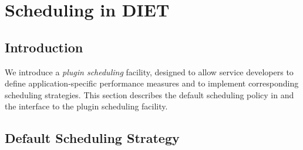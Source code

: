 

\newenvironment{code}
{\begin{list}{}{\setlength{\leftmargin}{1em}}\item\bfseries\tt}
{\end{list}}

\newenvironment{tinycode}
{\begin{list}{}{\setlength{\leftmargin}{1em}}\item\tiny\bfseries\tt}
{\end{list}}


\chapter{Scheduling in DIET}
\label{ch:plugin}

\section{Introduction}

We introduce a \emph{plugin scheduling} facility, designed to allow
\diet service developers to define application-specific performance
measures and to implement corresponding scheduling strategies.  This
section describes the default scheduling policy in \diet and the
interface to the plugin scheduling facility.

\section{Default Scheduling Strategy}\label{sect:default_sched}

